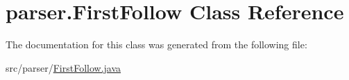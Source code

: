 \hypertarget{classparser_1_1FirstFollow}{}\section{parser.\+First\+Follow Class Reference}
\label{classparser_1_1FirstFollow}


The documentation for this class was generated from the following file\+:\begin{DoxyCompactItemize}
\item 
src/parser/\hyperlink{FirstFollow_8java}{First\+Follow.\+java}\end{DoxyCompactItemize}
